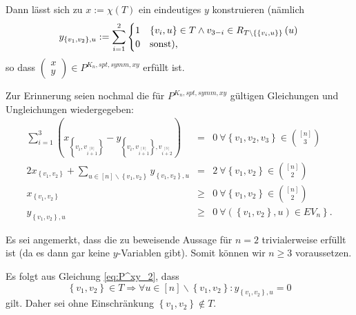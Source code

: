 \documentclass[10p,a4paper,BCOR = 12mm, DIV=15]{scrbook}
\begin{document}
{\begin{Sa}
Dann lässt sich zu $x:=\chi\left(T\right)$ ein eindeutiges $y$ konstruieren (nämlich 
\begin{equation}
y_{\left\{v_1, v_2\right\}, u} := \sum_{i=1}^2 \begin{cases}
1 & \left\{v_i, u\right\}\in T\wedge v_{3-i}\in R_{T\backslash \left\{\left\{v_i, u\right\}\right\}}\left(u\right)\\
0 & \textnormal{sonst),}
\end{cases} \label{eq:y_belegung}
\end{equation}
so dass $
\left(
\begin{array}{c}
x \\
y
\end{array}
\right)
\in P^{K_n, spt, symm, xy}$ erfüllt ist.
\end{Sa}
\begin{bew}
Zur Erinnerung seien nochmal die für $P^{K_n, spt, symm, xy}$ gültigen Gleichungen und Ungleichungen wiedergegeben:
\begin{eqnarray}
\sum_{i=1}^3 \left(x_{\left\{v_{i}, v_{i \stackrel{\left[3\right]}{+} 1}\right\}} -  y_{\left\{v_{i}, v_{i \stackrel{\left[3\right]}{+} 1}\right\}, v_{i \stackrel{\left[3\right]}{+} 2}}\right) & = & 0\ \forall \left\{v_1, v_2, v_3\right\}\in {[n] \choose 3} \label{eq:P^xy_1} \\
2 x_{\left\{v_1, v_2\right\}} + \sum_{u\in[n]\backslash\left\{v_1, v_2\right\}} y_{\left\{v_1, v_2\right\}, u} & = & 2\ \forall \left\{v_1, v_2\right\}\in {[n] \choose 2} \label{eq:P^xy_2} \\
x_{\left\{v_1, v_2\right\}} & \geq & 0 \ \forall \left\{v_1, v_2\right\} \in {\left[n\right] \choose 2} \nonumber \\
y_{\left\{v_1, v_2\right\}, u} & \geq & \left.0 \ \forall \left(\left\{v_1, v_2\right\}, u\right) \in EV_n\right\}. \nonumber
\end{eqnarray}

Es sei angemerkt, dass die zu beweisende Aussage für $n=2$ trivialerweise erfüllt ist (da es dann gar keine $y$-Variablen gibt). Somit können wir $n\geq 3$ voraussetzen.

Es folgt aus Gleichung \eqref{eq:P^xy_2}, dass
\begin{displaymath}
\left\{v_1, v_2\right\} \in T \Rightarrow \forall u \in \left[n\right] \backslash \left\{v_1, v_2\right\}: y_{\left\{v_1, v_2\right\}, u} = 0
\end{displaymath}
gilt. Daher sei ohne Einschränkung $\left\{v_1, v_2\right\} \notin T$.


\end{bew}}
\end{document}
